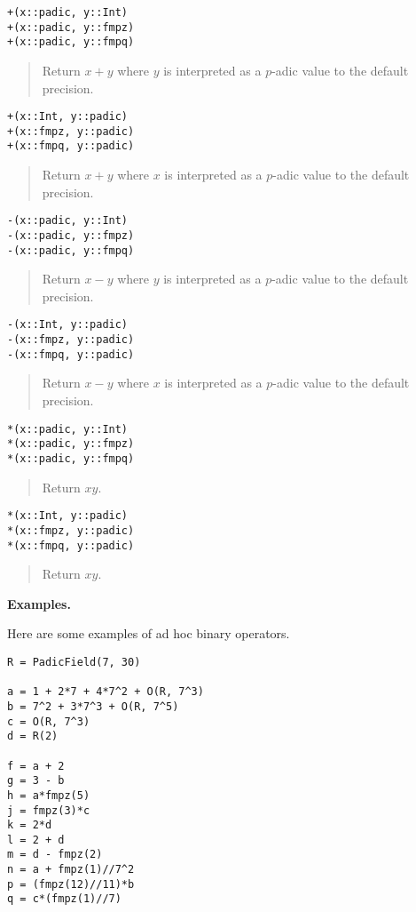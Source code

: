 \documentclass[a4paper,10pt]{article}
\newcommand{\desc}[1]{\vspace{-3mm}\begin{quote}#1\end{quote}}
\begin{document}
{{\begin{lstlisting}
+(x::padic, y::Int)
+(x::padic, y::fmpz)
+(x::padic, y::fmpq)
\end{lstlisting}

\desc{Return $x + y$ where $y$ is interpreted as a $p$-adic value to the default
precision.}

\begin{lstlisting}
+(x::Int, y::padic)
+(x::fmpz, y::padic)
+(x::fmpq, y::padic)
\end{lstlisting}

\desc{Return $x + y$ where $x$ is interpreted as a $p$-adic value to the default
precision.}

\begin{lstlisting}
-(x::padic, y::Int)
-(x::padic, y::fmpz)
-(x::padic, y::fmpq)
\end{lstlisting}

\desc{Return $x - y$ where $y$ is interpreted as a $p$-adic value to the default
precision.}

\begin{lstlisting}
-(x::Int, y::padic)
-(x::fmpz, y::padic)
-(x::fmpq, y::padic)
\end{lstlisting}

\desc{Return $x - y$ where $x$ is interpreted as a $p$-adic value to the default
precision.}

\begin{lstlisting}
*(x::padic, y::Int)
*(x::padic, y::fmpz)
*(x::padic, y::fmpq)
\end{lstlisting}

\desc{Return $xy$.}

\begin{lstlisting}
*(x::Int, y::padic)
*(x::fmpz, y::padic)
*(x::fmpq, y::padic)
\end{lstlisting}

\desc{Return $xy$.}

\textbf{Examples.}

Here are some examples of ad hoc binary operators.

\begin{lstlisting}
R = PadicField(7, 30)

a = 1 + 2*7 + 4*7^2 + O(R, 7^3)
b = 7^2 + 3*7^3 + O(R, 7^5)
c = O(R, 7^3)
d = R(2)

f = a + 2
g = 3 - b
h = a*fmpz(5)
j = fmpz(3)*c
k = 2*d
l = 2 + d
m = d - fmpz(2)
n = a + fmpz(1)//7^2
p = (fmpz(12)//11)*b
q = c*(fmpz(1)//7)
\end{lstlisting}

}}
\end{document}
